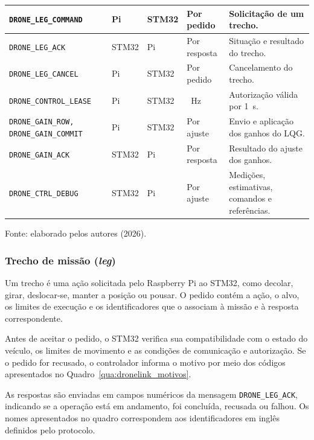 \begin{quadro}[H]
\begin{tabular}{|>{\raggedright\arraybackslash}p{4.2cm}|>{\centering\arraybackslash}p{1.1cm}|>{\centering\arraybackslash}p{1.1cm}|>{\raggedright\arraybackslash}p{1.6cm}|>{\raggedright\arraybackslash}p{5.4cm}|}
        \hline
        \texttt{DRONE\_\allowbreak LEG\_\allowbreak COMMAND} & Pi & STM32 & Por pedido & Solicitação de um trecho. \\
        \hline
        \texttt{DRONE\_\allowbreak LEG\_\allowbreak ACK} & STM32 & Pi & Por resposta & Situação e resultado do trecho. \\
        \hline
        \texttt{DRONE\_\allowbreak LEG\_\allowbreak CANCEL} & Pi & STM32 & Por pedido & Cancelamento do trecho. \\
        \hline
        \texttt{DRONE\_\allowbreak CONTROL\_\allowbreak LEASE} & Pi & STM32 & 5~Hz & Autorização válida por 1~s. \\
        \hline
        \texttt{DRONE\_\allowbreak GAIN\_\allowbreak ROW, DRONE\_\allowbreak GAIN\_\allowbreak COMMIT} & Pi & STM32 & Por ajuste & Envio e aplicação dos ganhos do LQG. \\
        \hline
        \texttt{DRONE\_\allowbreak GAIN\_\allowbreak ACK} & STM32 & Pi & Por resposta & Resultado do ajuste dos ganhos. \\
        \hline
        \texttt{DRONE\_\allowbreak CTRL\_\allowbreak DEBUG} & STM32 & Pi & Por ajuste & Medições, estimativas, comandos e referências. \\
        \hline
    \end{tabular}
    \par\vspace{0.2cm}
    \footnotesize Fonte: elaborado pelos autores (2026).
\end{quadro}

\subsubsection{Trecho de missão (\textit{leg})}\label{subsubsec:com_trecho}

Um trecho é uma ação solicitada pelo Raspberry Pi ao STM32, como decolar, girar, deslocar-se, manter a posição ou pousar. O pedido contém a ação, o alvo, os limites de execução e os identificadores que o associam à missão e à resposta correspondente.

Antes de aceitar o pedido, o STM32 verifica sua compatibilidade com o estado do veículo, os limites de movimento e as condições de comunicação e autorização. Se o pedido for recusado, o controlador informa o motivo por meio dos códigos apresentados no Quadro~\ref{qua:dronelink_motivos}.

As respostas são enviadas em campos numéricos da mensagem \texttt{DRONE\_LEG\_ACK}, indicando se a operação está em andamento, foi concluída, recusada ou falhou. Os nomes apresentados no quadro correspondem aos identificadores em inglês definidos pelo protocolo.


